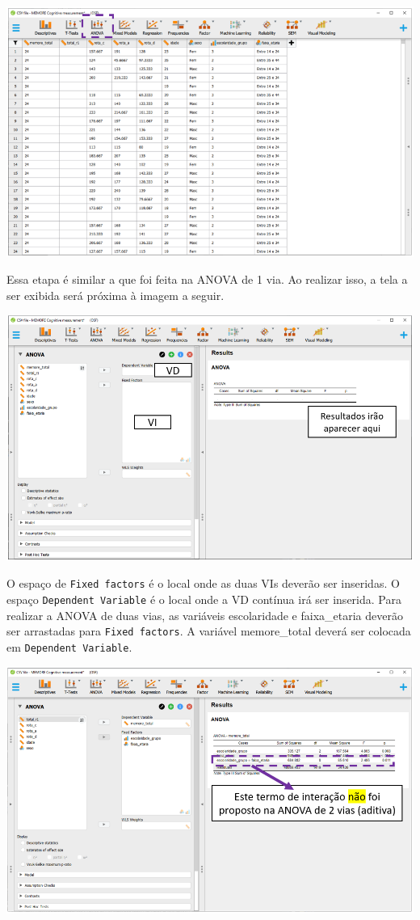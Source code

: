 \documentclass[
]{book}
\begin{document}
\includegraphics{./img/cap_anova_interface3.png}

Essa etapa é similar a que foi feita na ANOVA de 1 via. Ao realizar isso, a tela a ser exibida será próxima à imagem a seguir.

\includegraphics{./img/cap_anova_two_way_interface.png}

O espaço de \texttt{Fixed\ factors} é o local onde as duas VIs deverão ser inseridas. O espaço \texttt{Dependent\ Variable} é o local onde a VD contínua irá ser inserida. Para realizar a ANOVA de duas vias, as variáveis escolaridade e faixa\_etaria deverão ser arrastadas para \texttt{Fixed\ factors}. A variável memore\_total deverá ser colocada em \texttt{Dependent\ Variable}.

\includegraphics{./img/cap_anova_two_way_execucao.png}
\end{document}
